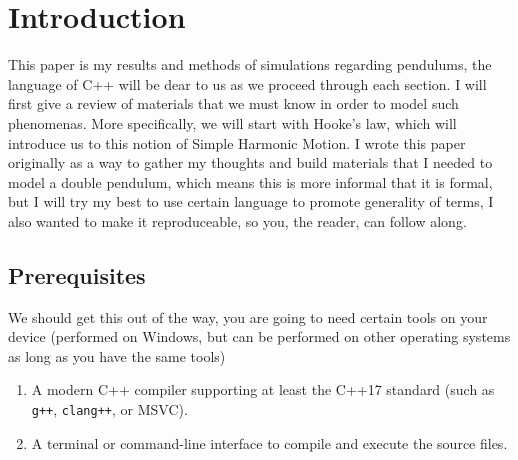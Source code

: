 
\section{Introduction}
This paper is my results and methods of simulations regarding
pendulums, the language of C++ will be dear to us as we
proceed through each section. I will first give a review of
materials that we must know in order to model such
phenomenas. More specifically, we will start
with Hooke's law, which will introduce us to this notion
of Simple Harmonic Motion. I wrote this paper originally
as a way to gather my thoughts and build materials that 
I needed to model a double pendulum, which means this is
more informal that it is formal, but I will try my best to
use certain language to promote generality of terms, I also
wanted to make it reproduceable, so you, the reader, can
follow along.
\subsection{Prerequisites}
We should get this out of the way, you are going to need certain
tools on your device (performed on Windows, but can be performed
on other operating systems as long as you have the same tools)
\begin{center}
\begin{minipage}{0.78\textwidth}
\begin{enumerate}
    \item A modern C++ compiler supporting at least the C++17 standard (such as \texttt{g++}, \texttt{clang++}, or MSVC).
    \item A terminal or command-line interface to compile and execute the source files.
\end{enumerate}
\end{minipage}
\end{center}


